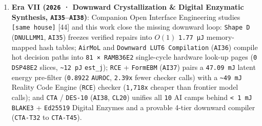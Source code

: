 \documentclass[10pt,letterpaper]{article}
\begin{document}
\begin{enumerate}
  \texttt{2024}, \texttt{AI33}) {[}51{]} standardized typed
  \texttt{JSON-\allowbreak{}RPC\ 2.\allowbreak{}0} tool schemas (\texttt{N\ +\ M}
  vs.~\(N \times M\) adapters), and \texttt{DeepSeek-\allowbreak{}R1} (\texttt{2025},
  \texttt{AI34}) {[}58{]} proved via Group Relative Policy Optimization
  (\texttt{GRPO}) that pure reinforcement learning against deterministic
  math/compiler verifiers spontaneously induces self-verification ---
  yet still re-expends thousands of thinking tokens
  (\texttt{\textasciitilde{}10–50+\ J}) on recurring structural problem
  classes.
\item
  \textbf{Era VII (\texttt{2026} · Downward Crystallization \& Digital
  Enzymatic Synthesis, \texttt{AI35}--\texttt{AI38})}: Companion Open
  Interface Engineering studies \texttt{{[}same\ house{]}} {[}44{]} and
  this work close the missing downward loop: \texttt{Shape\ D}
  (\texttt{DNULLMM1}, \texttt{AI35}) freezes verified repairs into
  \(O(1)\) \texttt{1.77\ µJ} memory-mapped hash tables; \texttt{AirMoL}
  and \texttt{Downward\ LUT6\ Compilation} (\texttt{AI36}) compile hot
  decision paths into \texttt{81\ ×\ RAMB36E2} single-cycle hardware
  look-up pages (\texttt{0} \texttt{DSP48E2} slices,
  \texttt{\textasciitilde{}12\ pJ} \texttt{est\_j}); \texttt{RCE} +
  \texttt{FormEBM} (\texttt{AI37}) pairs a \texttt{47.09\ mJ} latent
  energy pre-filter (\texttt{0.8922} \texttt{AUROC}, \texttt{2.39x}
  fewer checker calls) with a \texttt{\textasciitilde{}49\ mJ} Reality
  Code Engine (\texttt{RCE}) checker (\texttt{1,718x} cheaper than
  frontier model calls); and \texttt{CTA} / \texttt{DES-10}
  (\texttt{AI38}, \texttt{CL20}) unifies all \texttt{10} AI camps behind
  \texttt{\textless{}\ 1\ mJ} \texttt{BLAKE3} + \texttt{Ed25519} Digital
  Enzymes and a provable 4-tier downward compiler (\texttt{CTA-T32} to
  \texttt{CTA-T45}).
\end{enumerate}
\end{document}
